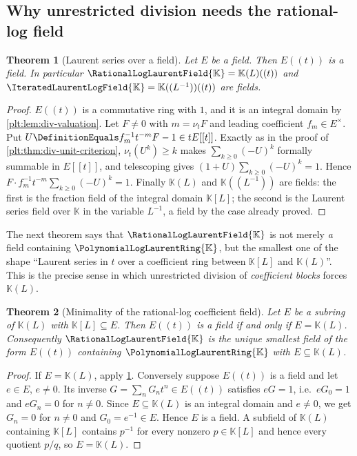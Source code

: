\documentclass[11pt,oneside]{article}
\theoremstyle{plain}
\newtheorem{theorem}{Theorem}[section]
\theoremstyle{definition}
\theoremstyle{remark}
\newcommand{\K}{\mathbb{K}}
\newcommand{\PLlau}{\PolynomialLogLaurentRing{\K}}       %
\newcommand{\PLrat}{\RationalLogLaurentField{\K}}        %
\newcommand{\PLit}{\IteratedLaurentLogField{\K}}         %
\newcommand{\ordt}{\nu_{t}}                              %
\begin{document}
\subsection{Why unrestricted division needs the rational-log field}
\label{plt:sec:div-rational-field}

\begin{theorem}[Laurent series over a field]\label{plt:thm:div-Ett-field}
Let \(E\) be a field.  Then \(E((t))\) is a field.  In particular
\(\PLrat=\K(L)((t))\) and \(\PLit=\K((L^{-1}))((t))\) are fields.
\end{theorem}

\begin{proof}
\(E((t))\) is a commutative ring with \(1\), and it is an integral domain by
\cref{plt:lem:div-valuation}.  Let \(F\ne0\) with \(m=\ordt F\) and leading
coefficient \(f_{m}\in E^{\times}\).  Put \(U\DefinitionEquals
f_{m}^{-1}t^{-m}F-1\in tE[[t]]\).  Exactly as in the proof of
\cref{plt:thm:div-unit-criterion}, \(\ordt(U^{k})\ge k\) makes
\(\sum_{k\ge0}(-U)^{k}\) formally summable in \(E[[t]]\), and telescoping gives
\((1+U)\sum_{k\ge0}(-U)^{k}=1\).  Hence
\(F\cdot f_{m}^{-1}t^{-m}\sum_{k\ge0}(-U)^{k}=1\).  Finally \(\K(L)\) and
\(\K((L^{-1}))\) are fields: the first is the fraction field of the integral
domain \(\K[L]\); the second is the Laurent series field over \(\K\) in the
variable \(L^{-1}\), a field by the case already proved.
\end{proof}

The next theorem says that \(\PLrat\) is not merely \emph{a} field containing
\(\PLlau\), but the smallest one of the shape ``Laurent series in \(t\) over a
coefficient ring between \(\K[L]\) and \(\K(L)\)''.  This is the precise sense
in which unrestricted division of \emph{coefficient blocks} forces \(\K(L)\).

\begin{theorem}[Minimality of the rational-log coefficient field]
\label{plt:thm:div-minimal-field}
Let \(E\) be a subring of \(\K(L)\) with \(\K[L]\subseteq E\).  Then \(E((t))\)
is a field if and only if \(E=\K(L)\).  Consequently \(\PLrat\) is the unique
smallest field of the form \(E((t))\) containing \(\PLlau\) with
\(E\subseteq\K(L)\).
\end{theorem}

\begin{proof}
If \(E=\K(L)\), apply \cref{plt:thm:div-Ett-field}.  Conversely suppose
\(E((t))\) is a field and let \(e\in E\), \(e\ne0\).  Its inverse
\(G=\sum_{n}G_{n}t^{n}\in E((t))\) satisfies \(eG=1\), i.e.\ \(eG_{0}=1\) and
\(eG_{n}=0\) for \(n\ne0\).  Since \(E\subseteq\K(L)\) is an integral domain
and \(e\ne0\), we get \(G_{n}=0\) for \(n\ne0\) and \(G_{0}=e^{-1}\in E\).
Hence \(E\) is a field.  A subfield of \(\K(L)\) containing \(\K[L]\) contains
\(p^{-1}\) for every nonzero \(p\in\K[L]\) and hence every quotient \(p/q\),
so \(E=\K(L)\).
\end{proof}
\end{document}
